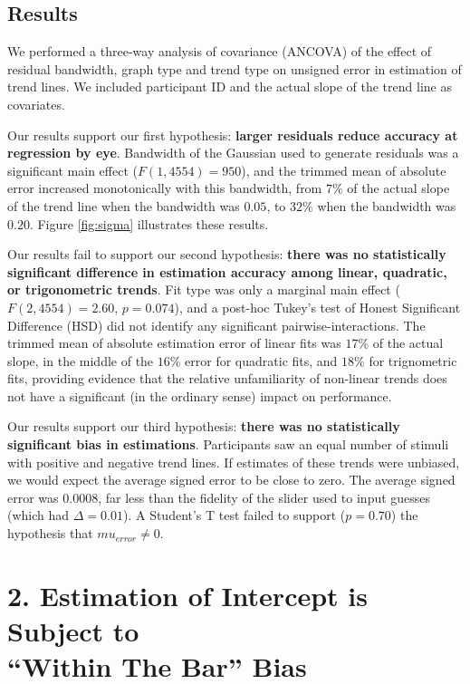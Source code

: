 \documentclass{sigchi}
\begin{document}
\subsection{Results}
We performed a three-way analysis of covariance (ANCOVA) of the effect of residual bandwidth, graph type and trend type on unsigned error in estimation of trend lines. We included participant ID and the actual slope of the trend line as covariates.

Our results support our first hypothesis: \textbf{larger residuals reduce accuracy at regression by eye}. Bandwidth of the Gaussian used to generate residuals was a significant main effect ($F(1,4554)=950$), and the trimmed mean of absolute error increased monotonically with this bandwidth, from $7\%$ of the actual slope of the trend line when the bandwidth was $0.05$, to $32\%$ when the bandwidth was $0.20$. Figure \ref{fig:sigma} illustrates these results.

Our results fail to support our second hypothesis: \textbf{there was no statistically significant difference in estimation accuracy among linear, quadratic, or trigonometric trends}. Fit type was only a marginal main effect ($F(2,4554)=2.60$, $p=0.074$), and a post-hoc Tukey's test of Honest Significant Difference (HSD) did not identify any significant pairwise-interactions. The trimmed mean of absolute estimation error of linear fits was $17\%$ of the actual slope, in the middle of the $16\%$ error for quadratic fits, and $18\%$ for trignometric fits, providing evidence that the relative unfamiliarity of non-linear trends does not have a significant (in the ordinary sense) impact on performance.

Our results support our third hypothesis: \textbf{there was no statistically significant bias in estimations}. Participants saw an equal number of stimuli with positive and negative trend lines. If estimates of these trends were unbiased, we would expect the average signed error to be close to zero. The average signed error was $0.0008$, far less than the fidelity of the slider used to input guesses (which had $\Delta=0.01$). A Student's T test failed to support ($p=0.70$) the hypothesis that $mu_{error}\ne0$.

\section{2. Estimation of Intercept is Subject to \\ ``Within The Bar'' Bias}
\end{document}
